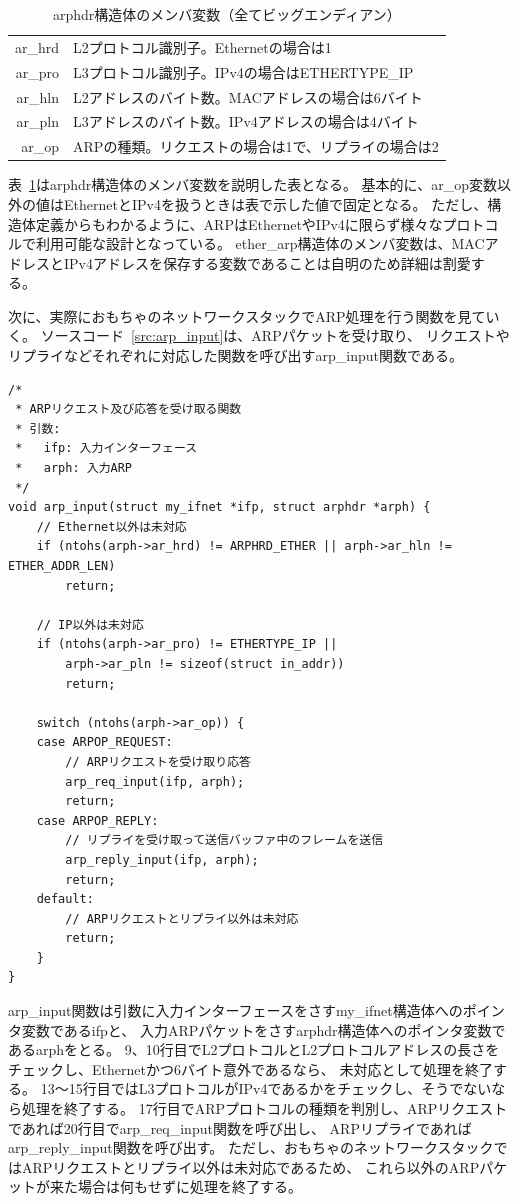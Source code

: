 \begin{table}[tb]
    \centering
    \caption{arphdr構造体のメンバ変数（全てビッグエンディアン）} \label{tab:arphdr}
    \begin{tabular}{rl}
        ar\_hrd & L2プロトコル識別子。Ethernetの場合は1 \\
        ar\_pro & L3プロトコル識別子。IPv4の場合はETHERTYPE\_IP \\
        ar\_hln & L2アドレスのバイト数。MACアドレスの場合は6バイト \\
        ar\_pln & L3アドレスのバイト数。IPv4アドレスの場合は4バイト \\
        ar\_op & ARPの種類。リクエストの場合は1で、リプライの場合は2 \\
    \end{tabular}
\end{table}

表~\ref{tab:arphdr}はarphdr構造体のメンバ変数を説明した表となる。
基本的に、ar\_op変数以外の値はEthernetとIPv4を扱うときは表で示した値で固定となる。
ただし、構造体定義からもわかるように、ARPはEthernetやIPv4に限らず様々なプロトコルで利用可能な設計となっている。
ether\_arp構造体のメンバ変数は、MACアドレスとIPv4アドレスを保存する変数であることは自明のため詳細は割愛する。

次に、実際におもちゃのネットワークスタックでARP処理を行う関数を見ていく。
ソースコード~\ref{src:arp_input}は、ARPパケットを受け取り、
リクエストやリプライなどそれぞれに対応した関数を呼び出すarp\_input関数である。
\begin{lstlisting}[caption=arp\_input関数,label=src:arp_input]
/*
 * ARPリクエスト及び応答を受け取る関数
 * 引数:
 *   ifp: 入力インターフェース
 *   arph: 入力ARP
 */
void arp_input(struct my_ifnet *ifp, struct arphdr *arph) {
    // Ethernet以外は未対応
    if (ntohs(arph->ar_hrd) != ARPHRD_ETHER || arph->ar_hln != ETHER_ADDR_LEN)
        return;

    // IP以外は未対応
    if (ntohs(arph->ar_pro) != ETHERTYPE_IP ||
        arph->ar_pln != sizeof(struct in_addr))
        return;

    switch (ntohs(arph->ar_op)) {
    case ARPOP_REQUEST:
        // ARPリクエストを受け取り応答
        arp_req_input(ifp, arph);
        return;
    case ARPOP_REPLY:
        // リプライを受け取って送信バッファ中のフレームを送信
        arp_reply_input(ifp, arph);
        return;
    default:
        // ARPリクエストとリプライ以外は未対応
        return;
    }
}
\end{lstlisting}
arp\_input関数は引数に入力インターフェースをさすmy\_ifnet構造体へのポインタ変数であるifpと、
入力ARPパケットをさすarphdr構造体へのポインタ変数であるarphをとる。
9、10行目でL2プロトコルとL2プロトコルアドレスの長さをチェックし、Ethernetかつ6バイト意外であるなら、
未対応として処理を終了する。
13〜15行目ではL3プロトコルがIPv4であるかをチェックし、そうでないなら処理を終了する。
17行目でARPプロトコルの種類を判別し、ARPリクエストであれば20行目でarp\_req\_input関数を呼び出し、
ARPリプライであればarp\_reply\_input関数を呼び出す。
ただし、おもちゃのネットワークスタックではARPリクエストとリプライ以外は未対応であるため、
これら以外のARPパケットが来た場合は何もせずに処理を終了する。

